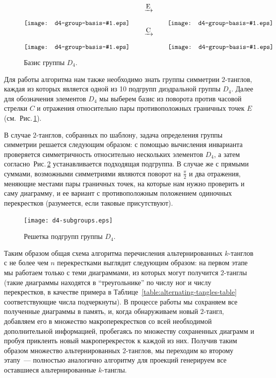 \documentclass[12pt]{article}
\theoremstyle{plain}
\theoremstyle{definition}
\def\figureref#1{Рис.\,\protect\ref{#1}}
\begin{document}
		\begin{figure}[ht]
			\centering
			\def\pic#1{\raise-7mm\hbox{\texttt{[image: d4-group-basis-\#1.eps]}}}
			$ \pic{1} \qquad \xrightarrow{\mbox{E}} \qquad \pic{2} $
			\qquad \qquad
			$ \pic{1} \qquad \xrightarrow{\mbox{C}} \qquad \pic{3} $
			\caption{\footnotesize Базис группы $D_4$.\label{figure:d4-group-basis}}
		\end{figure}

		Для работы алгоритма нам также необходимо знать группы симметрии $2$-танглов, каждая из которых является одной из 10
		подгрупп диэдральной группы $D_4$. Далее для обозначения элементов $D_4$ мы выберем базис из поворота против часовой
		стрелки $C$ и отражения относительно пары противоположных граничных точек $E$ (см.~\figureref{figure:d4-group-basis}).

		В случае $2$-танглов, собранных по шаблону, задача определения группы симметрии решается следующим образом: с помощью
		вычисления инварианта проверяется симметричность относительно нескольких элементов $D_4$, а затем
		согласно~\figureref{figure:D4-subgroups} устанавливается подходящая подгруппа. В случае же с прямыми суммами, возможными
		симметриями являются поворот на $\frac{\pi}{2}$ и два отражения, меняющие местами пары граничных точек, на которые нам
		нужно проверить и саму диаграмму, и ее вариант с противоположным положением одиночных перекрестков (разумеется, если
		таковые присутствуют).

		\begin{figure}[ht]
			\centering
			\texttt{[image: d4-subgroups.eps]}
			\caption{\footnotesize Решетка подгрупп группы $D_4$.\label{figure:D4-subgroups}}
		\end{figure}

		Таким образом общая схема алгоритма перечисления альтернированных $k$-танглов с не более чем $n$ перекрестками выглядит
		следующим образом: на первом этапе мы работаем только с теми диаграммами, из которых могут получится $2$-танглы (такие
		диаграммы находятся в ``треугольнике'' по числу ног и числу перекрестков, в качестве примера в
		Таблице~\ref{table:alternating-tangles-table} соответствующие числа подчеркнуты). В процессе работы мы сохраняем все
		полученные диаграммы в память, и, когда обнаруживаем новый $2$-тангл, добавляем его в множество макроперекрестков со всей
		необходимой дополнительной информацией, пробегаясь по множеству сохраненных диаграмм и пробуя приклеить новый макроперекресток к
		каждой из них. Получив таким образом множество альтернированных $2$-танглов, мы переходим ко второму этапу~--- полностью
		аналогично алгоритму для проекций генерируем все оставшиеся альтернированные $k$-танглы.
\end{document}
